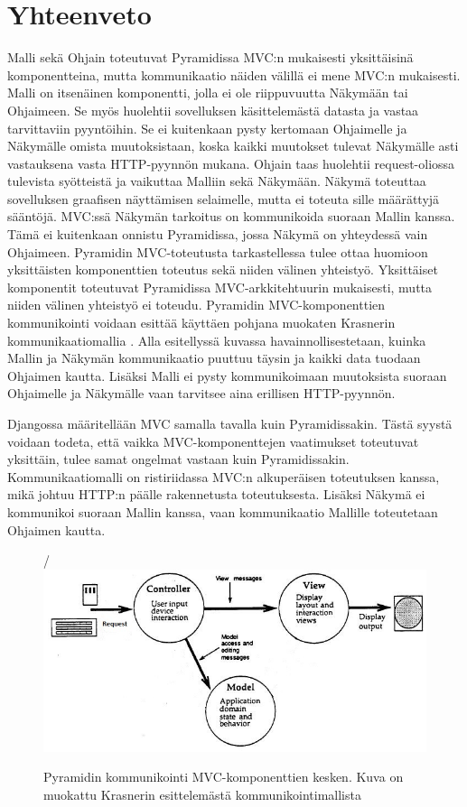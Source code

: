 \documentclass[utf8]{gradu3}
\begin{document}
\section{Yhteenveto}
Malli sekä Ohjain toteutuvat Pyramidissa MVC:n mukaisesti yksittäisinä komponentteina, mutta kommunikaatio näiden välillä ei mene MVC:n mukaisesti. Malli on itsenäinen komponentti, jolla ei ole riippuvuutta Näkymään tai Ohjaimeen. Se myös huolehtii sovelluksen käsittelemästä datasta ja vastaa tarvittaviin pyyntöihin. Se ei kuitenkaan pysty kertomaan Ohjaimelle ja Näkymälle omista muutoksistaan, koska kaikki muutokset tulevat Näkymälle asti vastauksena vasta HTTP-pyynnön mukana. Ohjain taas huolehtii request-oliossa tulevista syötteistä ja vaikuttaa Malliin sekä Näkymään. Näkymä toteuttaa sovelluksen graafisen näyttämisen selaimelle, mutta ei toteuta sille määrättyjä sääntöjä. MVC:ssä Näkymän tarkoitus on kommunikoida suoraan Mallin kanssa. Tämä ei kuitenkaan onnistu Pyramidissa, jossa Näkymä on yhteydessä vain Ohjaimeen. Pyramidin MVC-toteutusta tarkastellessa tulee ottaa huomioon yksittäisten komponenttien toteutus sekä niiden välinen yhteistyö. Yksittäiset komponentit toteutuvat Pyramidissa MVC-arkkitehtuurin mukaisesti, mutta niiden välinen yhteistyö ei toteudu. Pyramidin MVC-komponenttien kommunikointi voidaan esittää käyttäen pohjana muokaten Krasnerin kommunikaatiomallia \parencite{krasner_desc}.
Alla esitellyssä kuvassa havainnollisestetaan, kuinka Mallin ja Näkymän kommunikaatio puuttuu täysin ja kaikki data tuodaan Ohjaimen kautta. Lisäksi Malli ei pysty kommunikoimaan muutoksista suoraan Ohjaimelle ja Näkymälle vaan tarvitsee aina erillisen HTTP-pyynnön.

Djangossa määritellään MVC samalla tavalla kuin Pyramidissakin. Tästä syystä voidaan todeta, että vaikka MVC-komponenttejen vaatimukset toteutuvat yksittäin, tulee samat ongelmat vastaan kuin Pyramidissakin. Kommunikaatiomalli on ristiriidassa MVC:n alkuperäisen toteutuksen kanssa, mikä johtuu HTTP:n päälle rakennetusta toteutuksesta. Lisäksi Näkymä ei kommunikoi suoraan Mallin kanssa, vaan kommunikaatio Mallille toteutetaan Ohjaimen kautta. 

\begin{figure}[h]
\centering/
\includegraphics[scale=0.85]{pyramid_mvc.jpg}
\caption{Pyramidin kommunikointi MVC-komponenttien kesken. Kuva on muokattu Krasnerin esittelemästä kommunikointimallista \parencite{krasner_desc} }
\end{figure}
\end{document}
